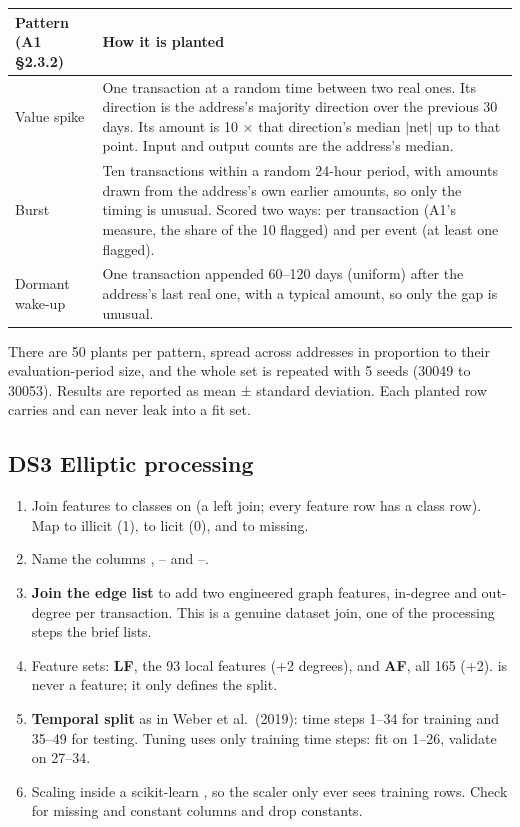 \begin{center}
\small
\begin{tabularx}{\textwidth}{@{}L{2.4cm}Y@{}}
\toprule
\textbf{Pattern (A1 §2.3.2)} & \textbf{How it is planted} \\
\midrule
Value spike & One transaction at a random time between two real ones. Its direction is the address's majority direction over the previous 30 days. Its amount is 10 × that direction's median $|\text{net}|$ up to that point. Input and output counts are the address's median. \\
Burst & Ten transactions within a random 24-hour period, with amounts drawn from the address's own earlier amounts, so only the timing is unusual. Scored two ways: per transaction (A1's measure, the share of the 10 flagged) and per event (at least one flagged). \\
Dormant wake-up & One transaction appended 60--120 days (uniform) after the address's last real one, with a typical amount, so only the gap is unusual. \\
\bottomrule
\end{tabularx}
\end{center}

There are 50 plants per pattern, spread across addresses in proportion to their evaluation-period
size, and the whole set is repeated with 5 seeds (30049 to 30053). Results are reported as mean ±
standard deviation. Each planted row carries  and can never leak into a
fit set.

\subsection{DS3 Elliptic processing}

\begin{enumerate}
  \item Join features to classes on  (a left join; every feature row has a class row).
    Map  to illicit (1),  to licit (0), and  to missing.
  \item Name the columns , -- and
    --.
  \item \textbf{Join the edge list} to add two engineered graph features, in-degree and
    out-degree per transaction. This is a genuine dataset join, one of the processing steps the
    brief lists.
  \item Feature sets: \textbf{LF}, the 93 local features (+2 degrees), and \textbf{AF}, all 165
    (+2).  is never a feature; it only defines the split.
  \item \textbf{Temporal split} as in Weber et al.\ (2019): time steps 1--34 for training and
    35--49 for testing. Tuning uses only training time steps: fit on 1--26, validate on 27--34.
  \item Scaling inside a scikit-learn , so the scaler only ever sees training
    rows. Check for missing and constant columns and drop constants.
\end{enumerate}

